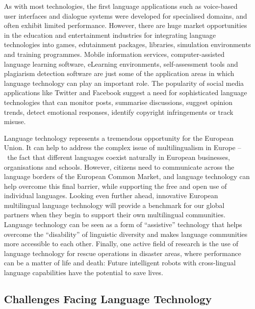 \begin{multicols}{2}
As with most technologies, the first language applications such as voice-based user interfaces and dialogue systems were developed for specialised domains, and often exhibit limited performance. However, there are huge market opportunities in the education and entertainment industries for integrating language technologies into games, edutainment packages, libraries, simulation environments and training programmes. Mobile information services, computer-assisted language learning software, eLearning environments, self-assessment tools and plagiarism detection software are just some of the application areas in which language technology can play an important role. The popularity of social media applications like Twitter and Facebook suggest a need for sophisticated language technologies that can monitor posts, summarise discussions, suggest opinion trends, detect emotional responses, identify copyright infringements or track misuse.


Language technology represents a tremendous opportunity for the European Union. It can help to address the complex issue of multilingualism in Europe --~the fact that different languages coexist naturally in European businesses, organisations and schools. However, citizens need to communicate across the language borders of the European Common Market, and language technology can help overcome this final barrier, while supporting the free and open use of individual languages. Looking even further ahead, innovative European multilingual language technology will provide a benchmark for our global partners when they begin to support their own multilingual communities. Language technology can be seen as a form of “assistive” technology that helps overcome the “disability” of linguistic diversity and makes language communities more accessible to each other. Finally, one active field of research is the use of language technology for rescue operations in disaster areas, where performance can be a matter of life and death: Future intelligent robots with cross-lingual language capabilities have the potential to save lives.

\subsection{Challenges Facing Language Technology}


\end{multicols}
